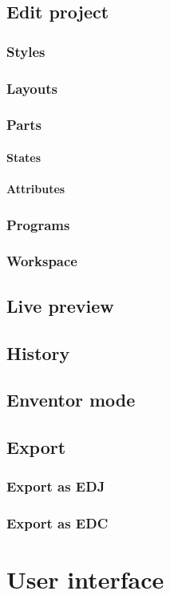 \documentclass[titlepage,oneside,11pt]{book}
\begin{document}
\section{Edit project}
\subsection{Styles}
\subsection{Layouts}
\subsection{Parts}
\subsubsection{States}
\subsubsection{Attributes}
\subsection{Programs}
\subsection{Workspace}
\section{Live preview}
\section{History}
\section{Enventor mode}
\section{Export}
\subsection{Export as EDJ}
\subsection{Export as EDC}
\chapter{User interface}
\end{document}
